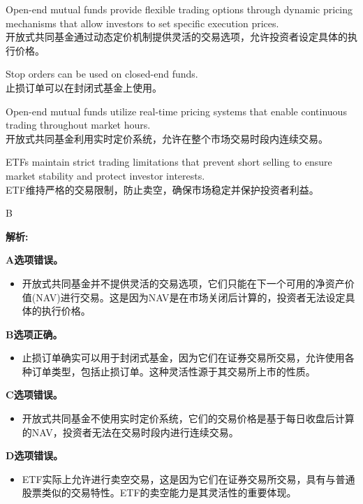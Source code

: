 \documentclass{article}
\newenvironment{explanation}
{\textbf{解析:}\par}
{\par}
\begin{document}
\begin{choices}
    \item Open-end mutual funds provide flexible trading options through dynamic pricing mechanisms that allow investors to set specific execution prices.\\
    开放式共同基金通过动态定价机制提供灵活的交易选项，允许投资者设定具体的执行价格。
    \item Stop orders can be used on closed-end funds.\\
    止损订单可以在封闭式基金上使用。
    \item Open-end mutual funds utilize real-time pricing systems that enable continuous trading throughout market hours.\\
    开放式共同基金利用实时定价系统，允许在整个市场交易时段内连续交易。
    \item ETFs maintain strict trading limitations that prevent short selling to ensure market stability and protect investor interests.\\
    ETF维持严格的交易限制，防止卖空，确保市场稳定并保护投资者利益。
\end{choices}

\begin{correctanswer}
    B
\end{correctanswer}

\begin{explanation}
    \textbf{A选项错误。}
    \begin{itemize}
        \item 开放式共同基金并不提供灵活的交易选项，它们只能在下一个可用的净资产价值(NAV)进行交易。这是因为NAV是在市场关闭后计算的，投资者无法设定具体的执行价格。
    \end{itemize}

    \textbf{B选项正确。}
    \begin{itemize}
        \item 止损订单确实可以用于封闭式基金，因为它们在证券交易所交易，允许使用各种订单类型，包括止损订单。这种灵活性源于其交易所上市的性质。
    \end{itemize}

    \textbf{C选项错误。}
    \begin{itemize}
        \item 开放式共同基金不使用实时定价系统，它们的交易价格是基于每日收盘后计算的NAV，投资者无法在交易时段内进行连续交易。
    \end{itemize}

    \textbf{D选项错误。}
    \begin{itemize}
        \item ETF实际上允许进行卖空交易，这是因为它们在证券交易所交易，具有与普通股票类似的交易特性。ETF的卖空能力是其灵活性的重要体现。
    \end{itemize}
\end{explanation}
\end{document}
